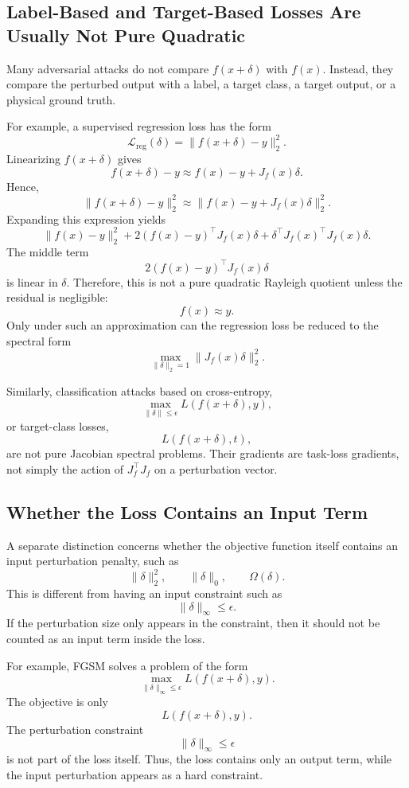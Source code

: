 \documentclass{article}
\begin{document}
\subsection{Label-Based and Target-Based Losses Are Usually Not Pure Quadratic}

Many adversarial attacks do not compare \(f(x+\delta)\) with \(f(x)\). Instead, they compare the perturbed output with a label, a target class, a target output, or a physical ground truth.

For example, a supervised regression loss has the form
\[
    \mathcal{L}_{\mathrm{reg}}(\delta)
    =
    \|f(x+\delta)-y\|_2^2.
\]
Linearizing \(f(x+\delta)\) gives
\[
    f(x+\delta)-y
    \approx
    f(x)-y+J_f(x)\delta.
\]
Hence,
\[
    \|f(x+\delta)-y\|_2^2
    \approx
    \|f(x)-y+J_f(x)\delta\|_2^2.
\]
Expanding this expression yields
\[
    \|f(x)-y\|_2^2
    +
    2(f(x)-y)^\top J_f(x)\delta
    +
    \delta^\top J_f(x)^\top J_f(x)\delta.
\]
The middle term
\[
    2(f(x)-y)^\top J_f(x)\delta
\]
is linear in \(\delta\). Therefore, this is not a pure quadratic Rayleigh quotient unless the residual is negligible:
\[
    f(x)\approx y.
\]
Only under such an approximation can the regression loss be reduced to the spectral form
\[
    \max_{\|\delta\|_2=1}
    \|J_f(x)\delta\|_2^2.
\]

Similarly, classification attacks based on cross-entropy,
\[
    \max_{\|\delta\|\le \epsilon}
    L(f(x+\delta),y),
\]
or target-class losses,
\[
    L(f(x+\delta),t),
\]
are not pure Jacobian spectral problems. Their gradients are task-loss gradients, not simply the action of \(J_f^\top J_f\) on a perturbation vector.

\subsection{Whether the Loss Contains an Input Term}

A separate distinction concerns whether the objective function itself contains an input perturbation penalty, such as
\[
    \|\delta\|_2^2,
    \qquad
    \|\delta\|_0,
    \qquad
    \Omega(\delta).
\]
This is different from having an input constraint such as
\[
    \|\delta\|_\infty\le \epsilon.
\]
If the perturbation size only appears in the constraint, then it should not be counted as an input term inside the loss.

For example, FGSM solves a problem of the form
\[
    \max_{\|\delta\|_\infty\le \epsilon}
    L(f(x+\delta),y).
\]
The objective is only
\[
    L(f(x+\delta),y).
\]
The perturbation constraint
\[
    \|\delta\|_\infty\le \epsilon
\]
is not part of the loss itself. Thus, the loss contains only an output term, while the input perturbation appears as a hard constraint.
\end{document}
